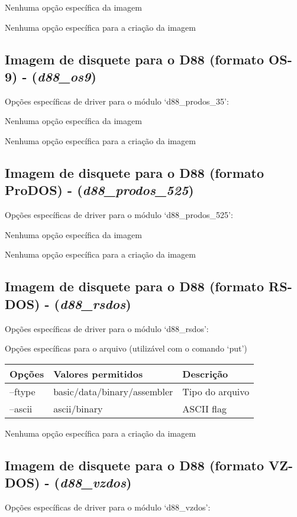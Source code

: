 \documentclass[letterpaper,10pt,brazil]{sphinxmanual}
\begin{document}
Nenhuma opção específica da imagem

Nenhuma opção específica para a criação da imagem


\subsection{Imagem de disquete para o D88 (formato OS-9) - (\emph{d88\_os9})}
\label{tools/imgtool:id1}
Opções específicas de driver para o módulo `d88\_prodos\_35':

Nenhuma opção específica da imagem

Nenhuma opção específica para a criação da imagem


\subsection{Imagem de disquete para o D88 (formato ProDOS) - (\emph{d88\_prodos\_525})}
\label{tools/imgtool:imagem-de-disquete-para-o-d88-formato-prodos-d88-prodos-525}
Opções específicas de driver para o módulo `d88\_prodos\_525':

Nenhuma opção específica da imagem

Nenhuma opção específica para a criação da imagem


\subsection{Imagem de disquete para o D88 (formato RS-DOS) - (\emph{d88\_rsdos})}
\label{tools/imgtool:imagem-de-disquete-para-o-d88-formato-rs-dos-d88-rsdos}
Opções específicas de driver para o módulo `d88\_rsdos':

Opções específicas para o arquivo (utilizável com o comando `put')

\noindent\begin{tabulary}{\linewidth}{|L|L|L|}
\hline

Opções
&
Valores permitidos
&
Descrição
\\
\hline
--ftype
&
basic/data/binary/assembler
&
Tipo do arquivo
\\
\hline
--ascii
&
ascii/binary
&
ASCII flag
\\
\hline\end{tabulary}


Nenhuma opção específica para a criação da imagem


\subsection{Imagem de disquete para o D88 (formato VZ-DOS) - (\emph{d88\_vzdos})}
\label{tools/imgtool:imagem-de-disquete-para-o-d88-formato-vz-dos-d88-vzdos}
Opções específicas de driver para o módulo `d88\_vzdos':
\end{document}
